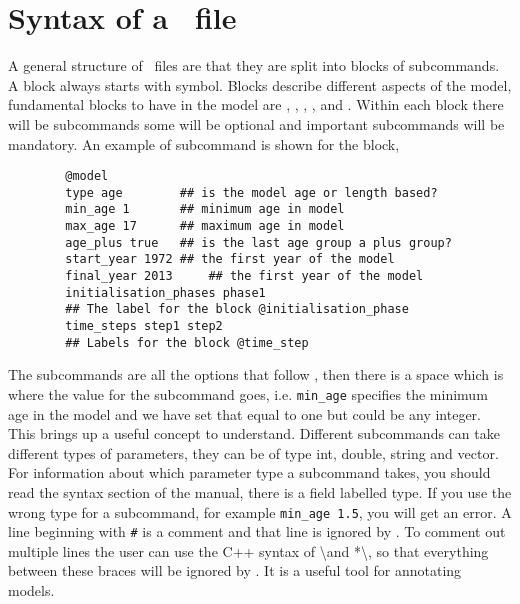 \section{Syntax of a \CNAME\ file}\label{Sec:stru}

A general structure of \CNAME\ files are that they are split into blocks of subcommands. A block always starts with \command{} symbol. Blocks describe different aspects of the model, fundamental blocks to have in the model are , , , , and . Within each block there will be subcommands some will be optional and important subcommands will be mandatory. An example of subcommand is shown for the  block,

{\small{\begin{verbatim}
		@model
		type age		## is the model age or length based?
		min_age 1		## minimum age in model
		max_age 17		## maximum age in model
		age_plus true	## is the last age group a plus group?
		start_year 1972	## the first year of the model
		final_year 2013 	## the first year of the model
		initialisation_phases phase1
		## The label for the block @initialisation_phase
		time_steps step1 step2
		## Labels for the block @time_step
		\end{verbatim}}}

The subcommands are all the options that follow , then there is a space which is where the value for the subcommand goes, i.e. \texttt{min\_age} specifies the minimum age in the model and we have set that equal to one but could be any integer. This brings up a useful concept to understand. Different subcommands can take different types of parameters, they can be of type int, double, string and vector. For information about which parameter type a subcommand takes, you should read the syntax section of the manual, there is a field labelled type. If you use the wrong type for a subcommand, for example \texttt{min\_age 1.5}, you will get an error. A line beginning with \texttt{\#} is a comment and that line is ignored by \CNAME. To comment out multiple lines the user can use the C++ syntax of \textbackslash* and *\textbackslash, so that everything between these braces will be ignored by \CNAME. It is a useful tool for annotating models. 

